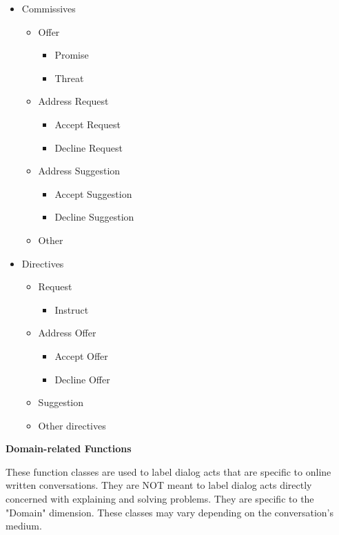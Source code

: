 \begin{itemize}
	\item Commissives
		\begin{itemize}
			\item Offer
				\begin{itemize}
					\item Promise
					\item Threat
				\end{itemize}
			\item Address Request
				\begin{itemize}
					\item Accept Request
					\item Decline Request
				\end{itemize}
			\item Address Suggestion
				\begin{itemize}
					\item Accept Suggestion
					\item Decline Suggestion
				\end{itemize}
			\item Other
		\end{itemize}
	\item Directives
		\begin{itemize}
			\item Request
				\begin{itemize}
					\item Instruct
				\end{itemize}
			\item Address Offer
				\begin{itemize}
					\item Accept Offer
					\item Decline Offer
				\end{itemize}
			\item Suggestion
			\item Other directives
		\end{itemize}
\end{itemize}

\textbf{Domain-related Functions}
\vspace{0.1cm}

These function classes are used to label dialog acts that are specific to online written conversations. They are NOT meant to label dialog acts directly concerned with explaining and solving problems. They are specific to the "Domain" dimension. These classes may vary depending on the conversation's medium.

